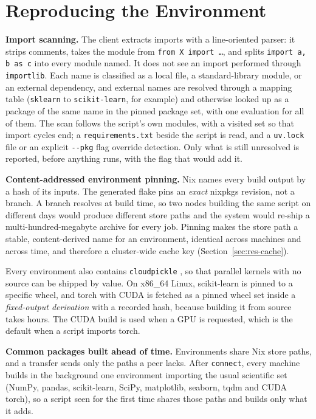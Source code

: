 \section{Reproducing the Environment}
\label{sec:env}

\textbf{Import scanning.} The client extracts imports with a line-oriented
parser: it strips comments, takes the module from \texttt{from X import \ldots},
and splits \texttt{import a, b as c} into every module named. It does not see an
import performed through \texttt{importlib}. Each name is classified as a local
file, a standard-library module, or an external dependency, and external names
are resolved through a mapping table (\texttt{sklearn} to
\texttt{scikit-learn}, for example) and otherwise looked up as a package of the
same name in the pinned package set, with one evaluation for all of them. The
scan follows the script's own modules, with a visited set so that import cycles
end; a \texttt{requirements.txt} beside the script is read, and a
\texttt{uv.lock} file or an explicit \texttt{-{}-pkg} flag override detection.
Only what is still unresolved is reported, before anything runs, with the flag
that would add it.

\textbf{Content-addressed environment pinning.} Nix \cite{dolstra2004nix} names every build output by a
hash of its inputs. The generated flake pins an \emph{exact} nixpkgs revision,
not a branch. A branch resolves at build time, so two nodes building the same
script on different days would produce different store paths and the system
would re-ship a multi-hundred-megabyte archive for every job. Pinning makes the
store path a stable, content-derived name for an environment, identical across
machines and across time, and therefore a cluster-wide cache key
(Section~\ref{sec:res-cache}).

Every environment also contains \texttt{cloudpickle} \cite{cloudpickle}, so that
parallel kernels with no source can be shipped by value. On x86\_64 Linux,
scikit-learn is pinned to a specific wheel, and torch with CUDA is fetched as a
pinned wheel set inside a \emph{fixed-output derivation} with a recorded hash,
because building it from source takes hours. The CUDA build is used when a GPU
is requested, which is the default when a script imports torch.

\textbf{Common packages built ahead of time.} Environments share Nix store
paths, and a transfer sends only the paths a peer lacks. After
\texttt{connect}, every machine builds in the background one environment
importing the usual scientific set (NumPy, pandas, scikit-learn, SciPy,
matplotlib, seaborn, tqdm and CUDA torch), so a script seen for the first time
shares those paths and builds only what it adds.

